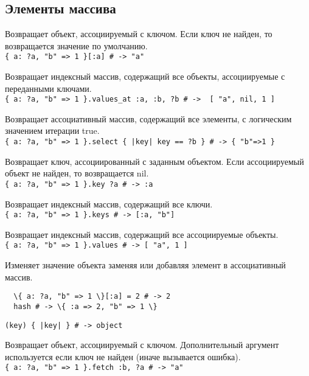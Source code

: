 \subsection*{Элементы массива} 

\begin{methodlist}
  Возвращает объект, ассоциируемый с ключом. Если ключ не найден, то возвращается значение по умолчанию. 
  \\\verb!{ a: ?a, "b" => 1 }[:a] # -> "a"!
  
  Возвращает индексный массив, содержащий все объекты, ассоциируемые с переданными ключами. 
  \\\verb!{ a: ?a, "b" => 1 }.values_at :a, :b, ?b # ->  [ "a", nil, 1 ]!
  
  Возвращает ассоциативный массив, содержащий все элементы, с логическим значением итерации true. 
  \\\verb!{ a: ?a, "b" => 1 }.select { |key| key == ?b } # -> { "b"=>1 }!
  
  Возвращает ключ, ассоциированный с заданным объектом. Если ассоциируемый объект не найден, то возвращается nil. 
  \\\verb!{ a: ?a, "b" => 1 }.key ?a # -> :a!

  Возвращает индексный массив, содержащий все ключи. 
  \\\verb!{ a: ?a, "b" => 1 }.keys # -> [:a, "b"]!
 
  Возвращает индексный массив, содержащий все ассоциируемые объекты. 
  \\\verb!{ a: ?a, "b" => 1 }.values # -> [ "a", 1 ]!
 
  Изменяет значение объекта заменяя или добавляя элемент в ассоциативный массив. 
  \begin{verbatim}
  \{ a: ?a, "b" => 1 \}[:a] = 2 # -> 2 
  hash # -> \{ :a => 2, "b" => 1 \}
  \end{verbatim}
   
  \verb!(key) { |key| } # -> object!

  Возвращает объект, ассоциируемый с ключом. Дополнительный аргумент используется если ключ не найден (иначе вызывается ошибка). 
  \\\verb!{ a: ?a, "b" => 1 }.fetch :b, ?a # -> "a"!
\end{methodlist}

